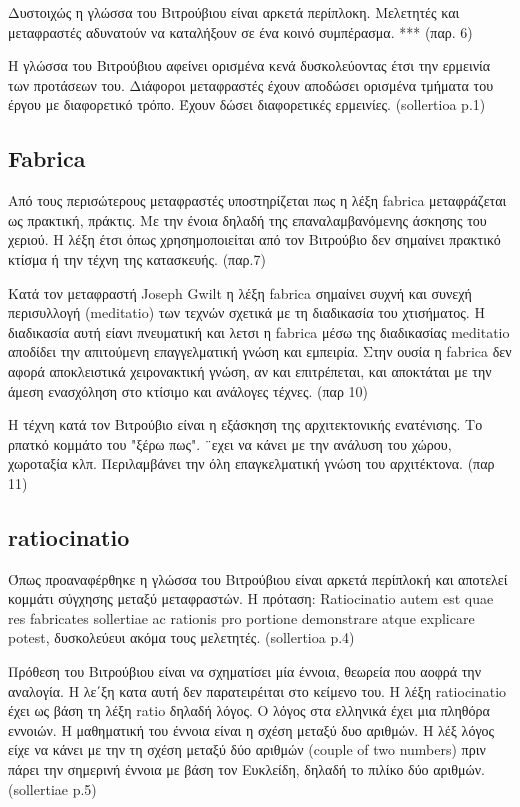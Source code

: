  Δυστοιχώς η γλώσσα του Βιτρούβιου είναι αρκετά περίπλοκη. Μελετητές και μεταφραστές αδυνατούν να καταλήξουν σε ένα κοινό συμπέρασμα. *** (παρ. 6)
 
 Η γλώσσα του Βιτρούβιου αφείνει ορισμένα κενά δυσκολεύοντας έτσι την ερμεινία των προτάσεων του. Διάφοροι μεταφραστές έχουν αποδώσει ορισμένα τμήματα του έργου με διαφορετικό τρόπο. Έχουν δώσει διαφορετικές ερμεινίες. (sollertioa p.1)
 
\subsection{Fabrica}
 
 Από τους περισώτερους μεταφραστές υποστηρίζεται πως η λέξη fabrica μεταφράζεται ως πρακτική, πράκτις. Με την ένοια δηλαδή της επαναλαμβανόμενης άσκησης του χεριού. Η λέξη έτσι όπως χρησημοποιείται από τον Βιτρούβιο δεν σημαίνει πρακτικό κτίσμα ή την τέχνη της κατασκευής. (παρ.7)
 
 Κατά τον μεταφραστή Joseph Gwilt η λέξη fabrica σημαίνει συχνή και συνεχή περισυλλογή (meditatio) των τεχνών σχετικά με τη διαδικασία του χτισήματος. Η διαδικασία αυτή είανι πνευματική και λετσι η fabrica μέσω της διαδικασίας meditatio αποδίδει την απιτούμενη επαγγελματική γνώση και εμπειρία. Στην ουσία η fabrica δεν αφορά αποκλειστικά χειρονακτική γνώση, αν και επιτρέπεται, και αποκτάται με την άμεση ενασχόληση στο κτίσιμο και ανάλογες τέχνες. (παρ 10)
 
 Η τέχνη κατά τον Βιτρούβιο είναι η εξάσκηση της αρχιτεκτονικής ενατένισης. Το ρπατκό κομμάτο του "ξέρω πως". ¨εχει να κάνει με την ανάλυση του χώρου, χωροταξία κλπ. Περιλαμβάνει την όλη επαγκελματική γνώση του αρχιτέκτονα. (παρ 11)
 
\subsection{ratiocinatio}
 
 Όπως προαναφέρθηκε η γλώσσα του Βιτρούβιου είναι αρκετά περίπλοκή και αποτελεί κομμάτι σύγχησης μεταξύ μεταφραστών. Η πρόταση:  Ratiocinatio autem est quae res fabricates sollertiae ac
rationis pro portione demonstrare atque explicare potest, δυσκολεύευι ακόμα τους μελετητές. (sollertioa p.4)
 
 Πρόθεση του Βιτρούβιου είναι να σχηματίσει μία έννοια, θεωρεία που αοφρά την αναλογία. Η λε΄ξη κατα αυτή δεν παρατειρέιται στο κείμενο του. Η λέξη ratiocinatio έχει ως βάση τη λέξη ratio δηλαδή λόγος. Ο λόγος στα ελληνικά έχει μια πληθόρα εννοιών. Η μαθηματική του έννοια είναι η σχέση μεταξύ δυο αριθμών. Η λέξ λόγος είχε να κάνει με την τη σχέση μεταξύ δύο αριθμών (couple of two numbers) πριν πάρει την σημερινή έννοια με βάση τον Ευκλείδη, δηλαδή το πιλίκο δύο αριθμών. (sollertiae p.5)
 
